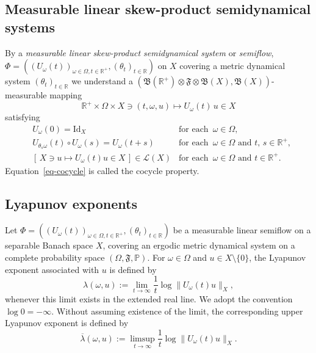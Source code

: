 \documentclass[reqno]{amsart}
\theoremstyle{plain}
\numberwithin{equation}{section}
\numberwithin{definition}{section}
\newcommand\RR{\ensuremath{\mathbb{R}}}
\begin{document}
{%
\subsection{Measurable linear skew-product semidynamical systems}\label{subsec:MLSPS} 

By a {\em measurable linear skew-product semidynamical system} or {\em semiflow}, 
$\Phi = \allowbreak ((U_\omega(t))_{\omega \in \Omega, t \in \RR^{+}}, \allowbreak (\theta_t)_{t\in\RR})$ on  $X$ covering a metric dynamical system $(\theta_{t})_{t \in \RR}$ we understand a $(\mathfrak{B}(\RR^{+}) \otimes \mathfrak{F} \otimes \mathfrak{B}(X), \mathfrak{B}(X))$\nobreakdash-\hspace{0pt}measurable
mapping
\begin{equation*}
 \RR^{+} \times \Omega \times X \ni (t,\omega,u) \mapsto U_{\omega}(t)\,u \in X 
\end{equation*}
satisfying
\begin{align}
&U_{\omega}(0) = \mathrm{Id}_{X} \quad & \textrm{for each }\,\omega  \in \Omega, \nonumber 
\\
&U_{\theta_{s}\omega}(t) \circ U_{\omega}(s)= U_{\omega}(t+s) \qquad &\textrm{for each } \,\omega \in \Omega \textrm{ and }  t,\,s \in \RR^{+},
\label{eq-cocycle}
\\
&[\, X \ni u \mapsto U_{\omega}(t)u \in X \,] \in \mathcal{L}(X) & \textrm{for each }\,\omega \in \Omega \textrm{ and } t \in \RR^{+}.\nonumber
\end{align}
Equation~\eqref{eq-cocycle} is called the cocycle property.


\subsection{Lyapunov exponents}
Let $\Phi = \allowbreak ((U_\omega(t))_{\omega \in \Omega, t \in \RR^{+}}, \allowbreak (\theta_t)_{t\in\RR})$ be a measurable
linear semiflow on a separable Banach space $X$, covering an
ergodic metric dynamical system on a complete probability
space $(\Omega,\mathfrak F,\mathbb P)$.
For $\omega\in\Omega$ and $u\in X\setminus\{0\}$, the
Lyapunov exponent associated with $u$ is defined by
\begin{equation*}
    \lambda(\omega,u)
    :=
    \lim_{t\to\infty}
    \frac{1}{t}\log\|U_\omega(t)u\|_X,
\end{equation*}
whenever this limit exists in the extended real line.
We adopt the convention $\log 0=-\infty$.
Without assuming existence of the limit, the corresponding
upper Lyapunov exponent is defined by
\begin{equation*}
    \overline\lambda(\omega,u)
    :=
    \limsup_{t\to\infty}
    \frac{1}{t}\log\|U_\omega(t)u\|_X.
\end{equation*}

}
\end{document}
